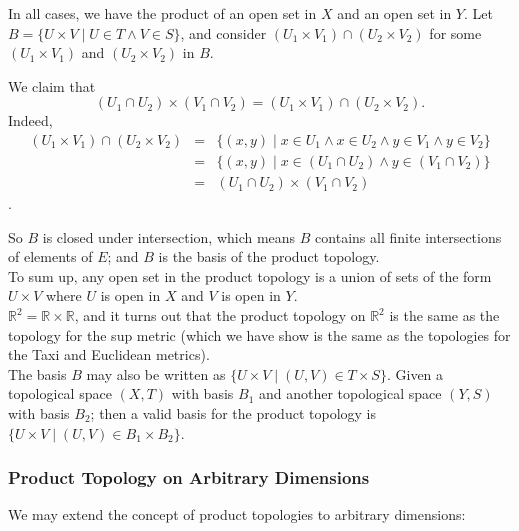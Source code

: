 \documentclass[12pt]{report}
\newcommand{\example}{  \noindent{\sc Example }\hspace{5pt} }
\newcommand{\exercise}{ \noindent{\sc Exercise }\hspace{5pt} }
\newcommand{\reals}{\mathbb{R}}
\begin{document}

In all cases, we have the product of an open set in $X$ and an open set in
$Y$. Let $B = \{ U \times V \mid U \in T \land V \in S \}$, and consider 
$(U_1 \times V_1) \cap (U_2 \times V_2)$ for some $(U_1 \times V_1)$ and $(U_2
\times V_2)$ in $B$.

We claim that 
\begin{displaymath}
(U_1 \cap U_2) \times (V_1 \cap V_2) = (U_1 \times V_1) \cap (U_2 \times V_2).
\end{displaymath}
Indeed,
\begin{eqnarray*}
(U_1 \times V_1) \cap (U_2 \times V_2) 
 & = & \{(x,y) \mid x \in U_1 \land
                    x \in U_2 \land y \in V_1 \land y \in V_2 \} \\
 & = & \{(x,y) \mid x \in (U_1 \cap U_2) \land y \in (V_1 \cap V_2)\} \\
 & = & (U_1 \cap U_2) \times (V_1 \cap V_2)
\end{eqnarray*}.

So $B$ is closed under intersection, which means $B$ contains all finite
intersections of elements of $E$; and $B$ is the basis of the product
topology.\\

To sum up, any open set in the product topology is a union of sets of 
the form $U \times V$ where $U$ is open in $X$ and $V$ is open in $Y$.\\

\example $\reals^2 = \reals \times \reals$, and it turns out that the
product topology on $\reals^2$ is the same as the topology for the sup metric
(which we have show is the same as the topologies for the Taxi and Euclidean
metrics).\\

\exercise The basis $B$ may also be written as
$\{U \times V \mid (U,V) \in T \times S\}$. Given a topological space $(X,T)$
with basis $B_1$ and another topological space $(Y,S)$ with basis $B_2$; then
a valid basis for the product topology is $\{U \times V \mid (U,V) \in B_1
\times B_2\}$.\\

\subsubsection{Product Topology on Arbitrary Dimensions}

We may extend the concept of product topologies to arbitrary dimensions:\\
\end{document}
